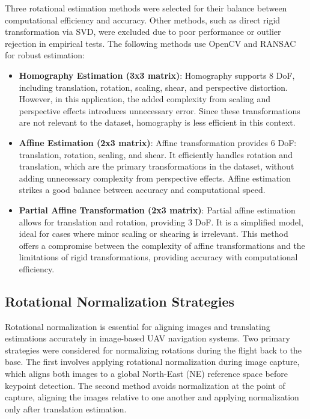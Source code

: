 Three rotational estimation methods were selected for their balance between computational efficiency and accuracy. Other methods, such as direct rigid transformation via SVD, were excluded due to poor performance or outlier rejection in empirical tests. The following methods use OpenCV and RANSAC for robust estimation:

\begin{itemize}
    \item \textbf{Homography Estimation (3x3 matrix)}: 
    Homography supports 8 DoF, including translation, rotation, scaling, shear, and perspective distortion. However, in this application, the added complexity from scaling and perspective effects introduces unnecessary error. Since these transformations are not relevant to the dataset, homography is less efficient in this context.

    \item \textbf{Affine Estimation (2x3 matrix)}:
    Affine transformation provides 6 DoF: translation, rotation, scaling, and shear. It efficiently handles rotation and translation, which are the primary transformations in the dataset, without adding unnecessary complexity from perspective effects. Affine estimation strikes a good balance between accuracy and computational speed.

    \item \textbf{Partial Affine Transformation (2x3 matrix)}:
    Partial affine estimation allows for translation and rotation, providing 3 DoF. It is a simplified model, ideal for cases where minor scaling or shearing is irrelevant. This method offers a compromise between the complexity of affine transformations and the limitations of rigid transformations, providing accuracy with computational efficiency.
\end{itemize}



    
\subsection*{Rotational Normalization Strategies}

Rotational normalization is essential for aligning images and translating estimations accurately in image-based UAV navigation systems. Two primary strategies were considered for normalizing rotations during the flight back to the base. The first involves applying rotational normalization during image capture, which aligns both images to a global North-East (NE) reference space before keypoint detection. The second method avoids normalization at the point of capture, aligning the images relative to one another and applying normalization only after translation estimation.

